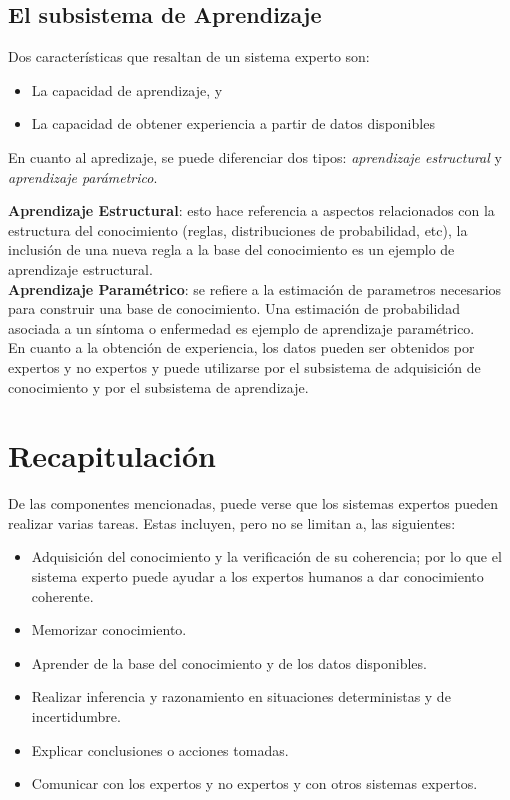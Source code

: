 \documentclass{article}
\begin{document}
\subsection{El subsistema de Aprendizaje}
Dos caracter\'isticas  que resaltan de un sistema experto son:
\begin{itemize}
\item La capacidad de aprendizaje, y
\item La capacidad de obtener experiencia a partir de datos disponibles
\end{itemize}

En cuanto al apredizaje, se puede diferenciar dos tipos: \textit{aprendizaje
estructural} y \textit{aprendizaje par\'ametrico}.

\textbf{Aprendizaje Estructural}: esto hace referencia a aspectos relacionados
con la estructura del conocimiento (reglas, distribuciones de probabilidad,
etc), la inclusi\'on de una nueva regla a la base del conocimiento es un
ejemplo de aprendizaje estructural.\\

\textbf{Aprendizaje Param\'etrico}: se refiere a la estimaci\'on de parametros
necesarios para construir una base de conocimiento. Una estimaci\'on de
probabilidad asociada a un s\'intoma o enfermedad es ejemplo de aprendizaje
param\'etrico.\\

En cuanto a la obtenci\'on de experiencia, los datos pueden ser obtenidos por
expertos y no expertos y puede utilizarse por el subsistema de adquisici\'on de
conocimiento y por el subsistema de aprendizaje.

\section*{Recapitulaci\'on}
De las componentes mencionadas, puede verse que los sistemas expertos pueden
realizar varias tareas. Estas incluyen, pero no se limitan a, las
siguientes:
\begin{itemize}
\item Adquisici\'on del conocimiento y la verificaci\'on de su coherencia; por
lo que el sistema experto puede ayudar a los expertos humanos a dar
conocimiento coherente.
\item Memorizar conocimiento.
\item Aprender de la base del conocimiento y de los datos disponibles.
\item Realizar inferencia y razonamiento en situaciones deterministas y de
incertidumbre.
\item Explicar conclusiones o acciones tomadas.
\item Comunicar con los expertos y no expertos y con otros sistemas
expertos.
\end{itemize}
\end{document}
